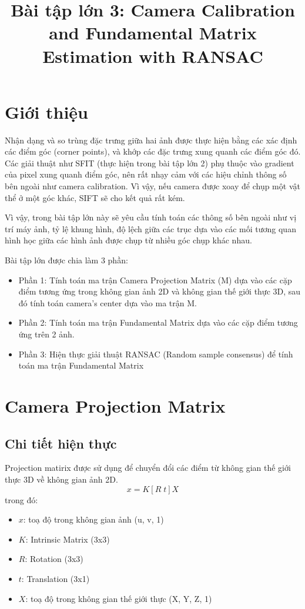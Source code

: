 \documentclass[11pt]{article}
\date{}
\title{\vspace{-1cm}Bài tập lớn 3: Camera Calibration and Fundamental Matrix Estimation with RANSAC}
\begin{document}
\maketitle
\vspace{-2cm}
\thispagestyle{fancy}

\section*{Giới thiệu}
Nhận dạng và so trùng đặc trưng giữa hai ảnh được thực hiện bằng các xác định các điểm góc (corner points), và khớp các đặc trưng xung quanh các điểm góc đó. Các giải thuật như SFIT (thực hiện trong bài tập lớn 2) phụ thuộc vào gradient của pixel xung quanh điểm góc, nên rất nhạy cảm với các hiệu chỉnh thông số bên ngoài như camera calibration. Vì vậy, nếu camera được xoay để chụp một vật thể ở một góc khác, SIFT sẽ cho kết quả rất kém.

Vì vậy, trong bài tập lớn này sẽ yêu cầu tính toán các thông số bên ngoài như vị trí máy ảnh, tỷ lệ khung hình, độ lệch giữa các trục dựa vào các mối tương quan hình học giữa các hình ảnh được chụp từ nhiều góc chụp khác nhau.

Bài tập lớn được chia làm 3 phần:
\begin{itemize}
    \item Phần 1: Tính toán ma trận Camera Projection Matrix (M) dựa vào các cặp điểm tương ứng trong không gian ảnh 2D và không gian thế giới thực 3D, sau đó tính toán camera's center dựa vào ma trận M.
    \item Phần 2: Tính toán ma trận Fundamental Matrix dựa vào các cặp điểm tương ứng trên 2 ảnh.
    \item Phần 3: Hiện thực giải thuật RANSAC (Random sample consensus) để tính toán ma trận Fundamental Matrix
\end{itemize}

\section*{Camera Projection Matrix}

\subsection*{Chi tiết hiện thực}

Projection matirix được sử dụng để chuyển đổi các điểm từ không gian thế giới thực 3D về không gian ảnh 2D.
\begin{equation*}
    \mathit{x} = \mathit{K} [\mathit{R} \; \mathit{t}] \mathit{X}
\end{equation*}
trong đó:
\begin{itemize}
    \item $\mathit{x}$: toạ độ trong không gian ảnh (u, v, 1)
    \item $\mathit{K}$: Intrinsic Matrix (3x3)
    \item $\mathit{R}$: Rotation (3x3)
    \item $\mathit{t}$: Translation (3x1)
    \item $\mathit{X}$: toạ độ trong không gian thế giới thực (X, Y, Z, 1)
\end{itemize}
\end{document}

